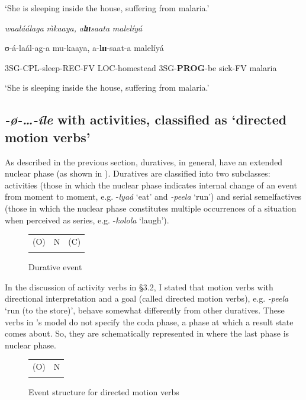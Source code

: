 \documentclass[output=paper,newtxmath,modfonts,nonflat,draftmode]{langsci/langscibook}
\begin{document}
       ‘She is sleeping inside the house, suffering from malaria.’


 \ex \textit{waaláálaga}                \textit{\`{m}}\textit{kaaya,}         \textit{a}\textbf{\textit{l}}\textbf{\textit{ɪɪ}}\textit{saata}                   \textit{malelíyá}


      ʊ-á-laál-ag-a             mu-kaaya,      a-\textbf{lɪɪ}-saat-a                malelíyá

       3SG-CPL-sleep-REC-FV LOC-homestead 3SG-\textbf{PROG}-be sick-FV malaria

      ‘She is sleeping inside the house, suffering from malaria.’
\z
\z

\subsection{\textit{-}\textit{ø-…-íle} with activities, classified as ‘directed motion verbs’}

As described in the previous section, duratives, in general, have an extended nuclear phase (as shown in ). Duratives are classified into two subclasses: activities (those in which the nuclear phase indicates internal change of an event from moment to moment, e.g. -\textit{lyaá} ‘eat’ and \textit{-peela} ‘run’) and serial semelfactives (those in which the nuclear phase constitutes multiple occurrences of a situation when perceived as series, e.g. -\textit{kolola} ‘laugh’). 

\begin{figure}
\caption{Durative event\label{fig:kanijo:9}}

\begin{tabularx}{\textwidth}{XXX}
\lsptoprule

(O) & N & (C)\\
\lspbottomrule
\end{tabularx}
\end{figure} 

In the discussion of activity verbs in §3.2, I stated that motion verbs with directional interpretation and a goal (called directed motion verbs), e.g. \textit{-peela} ‘run (to the store)’, behave somewhat differently from other duratives. These verbs in \citeauthor{Botne2000}'s model do not specify the coda phase, a phase at which a result state comes about. So, they are schematically represented in  where the last phase is nuclear phase. 

\begin{figure}
\caption{Event structure for directed motion verbs\label{fig:kanijo:10}}
\begin{tabularx}{\textwidth}{XX}
\lsptoprule
(O) & N\\
\lspbottomrule
\end{tabularx}
\end{figure}
\end{document}
